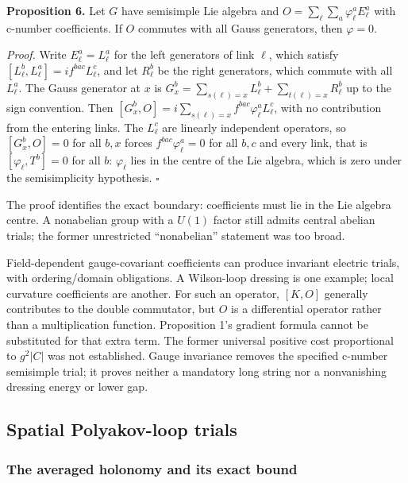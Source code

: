 \documentclass[11pt,a4paper]{article}
\begin{document}
\textbf{Proposition 6.} Let \(G\) have semisimple Lie algebra and
\(O=\sum_\ell\sum_a\varphi^a_\ell E^a_\ell\) with c-number coefficients.
If \(O\) commutes with all Gauss generators, then \(\varphi=0\).

\emph{Proof.} Write \(E^a_\ell=L^a_\ell\) for the left generators of
link \(\ell\), which satisfy \([L^b_\ell,L^a_\ell]=if^{bac}L^c_\ell\),
and let \(R^b_\ell\) be the right generators, which commute with all
\(L^a_\ell\). The Gauss generator at \(x\) is
\(G^b_x=\sum_{s(\ell)=x}L^b_\ell+\sum_{t(\ell)=x}R^b_\ell\) up to the
sign convention. Then
\([G^b_x,O]=i\sum_{s(\ell)=x}f^{bac}\varphi^a_\ell L^c_\ell\), with no
contribution from the entering links. The \(L^c_\ell\) are linearly
independent operators, so \([G^b_x,O]=0\) for all \(b,x\) forces
\(f^{bac}\varphi^a_\ell=0\) for all \(b,c\) and every link, that is
\([\varphi_\ell,T^b]=0\) for all \(b\): \(\varphi_\ell\) lies in the
centre of the Lie algebra, which is zero under the semisimplicity
hypothesis. \(\square\)

The proof identifies the exact boundary: coefficients must lie in the
Lie algebra centre. A nonabelian group with a \(U(1)\) factor still
admits central abelian trials; the former unrestricted ``nonabelian''
statement was too broad.

Field-dependent gauge-covariant coefficients can produce invariant
electric trials, with ordering/domain obligations. A Wilson-loop
dressing is one example; local curvature coefficients are another. For
such an operator, \([K,O]\) generally contributes to the double
commutator, but \(O\) is a differential operator rather than a
multiplication function. Proposition 1's gradient formula cannot be
substituted for that extra term. The former universal positive cost
proportional to \(g^2|C|\) was not established. Gauge invariance removes
the specified c-number semisimple trial; it proves neither a mandatory
long string nor a nonvanishing dressing energy or lower gap.

\hypertarget{spatial-polyakov-loop-trials}{%
\subsection{Spatial Polyakov-loop
trials}\label{spatial-polyakov-loop-trials}}

\hypertarget{the-averaged-holonomy-and-its-exact-bound}{%
\subsubsection{The averaged holonomy and its exact
bound}\label{the-averaged-holonomy-and-its-exact-bound}}
\end{document}
